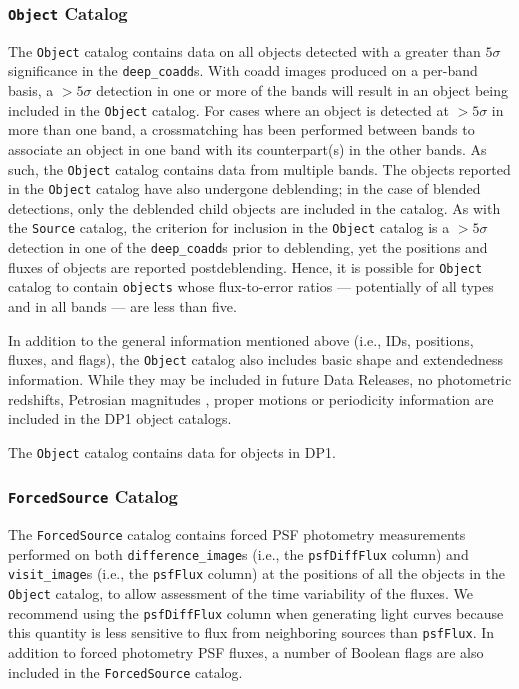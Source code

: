 \subsubsection{\texttt{Object} Catalog}
The \texttt{Object} catalog \citep[][]{10.71929/rubin/2570325} contains data on all objects detected with a greater than $5\sigma$ significance in the \texttt{deep\_coadd}s.
With coadd images produced on a per-band basis, a $>5\sigma$ detection in one or more of the bands will result in an object being included in the \texttt{Object} catalog.
For cases where an object is detected at $>5\sigma$ in more than one band, a crossmatching has been performed between bands to associate an object in one band with its counterpart(s) in the other bands.
As such, the \texttt{Object} catalog contains data from multiple bands.
The objects reported in the \texttt{Object} catalog have also undergone deblending; in the case of blended detections, only the deblended child objects are included in the catalog.
As with the \texttt{Source} catalog, the criterion for inclusion in the \texttt{Object} catalog is a $>5\sigma$ detection in one of the \texttt{deep\_coadd}s prior to deblending, yet the positions and fluxes of objects are reported postdeblending.
Hence, it is possible for \texttt{Object} catalog to contain \texttt{objects} whose \gls{flux}-to-error ratios --- potentially of all types and in all bands --- are less than five.

In addition to the general information mentioned above (i.e., IDs, positions, fluxes, and flags), the \texttt{Object} catalog also includes basic \gls{shape} and extendedness information.
While they may be included in future Data Releases, no photometric redshifts, Petrosian magnitudes \citep[][]{1976ApJ...209L...1P}, proper motions or periodicity information are included in the \gls{DP1} object catalogs.

The \texttt{Object} catalog contains data for \nobjects objects in \gls{DP1}.

\subsubsection{\texttt{ForcedSource} Catalog}
The \texttt{ForcedSource} catalog \citep[][]{10.71929/rubin/2570327} contains forced \gls{PSF} photometry measurements performed on both \texttt{difference\_image}s (i.e., the \texttt{psfDiffFlux} column) and \texttt{visit\_image}s (i.e., the \texttt{psfFlux} column) at the positions of all the objects in the \texttt{Object} catalog, to allow assessment of the time variability of the fluxes.
We recommend using the \texttt{psfDiffFlux} column when generating light curves because this quantity is less sensitive to \gls{flux} from neighboring sources than \texttt{psfFlux}.
In addition to \gls{forced photometry} \gls{PSF} fluxes, a number of Boolean flags are also included in the \texttt{ForcedSource} catalog.

